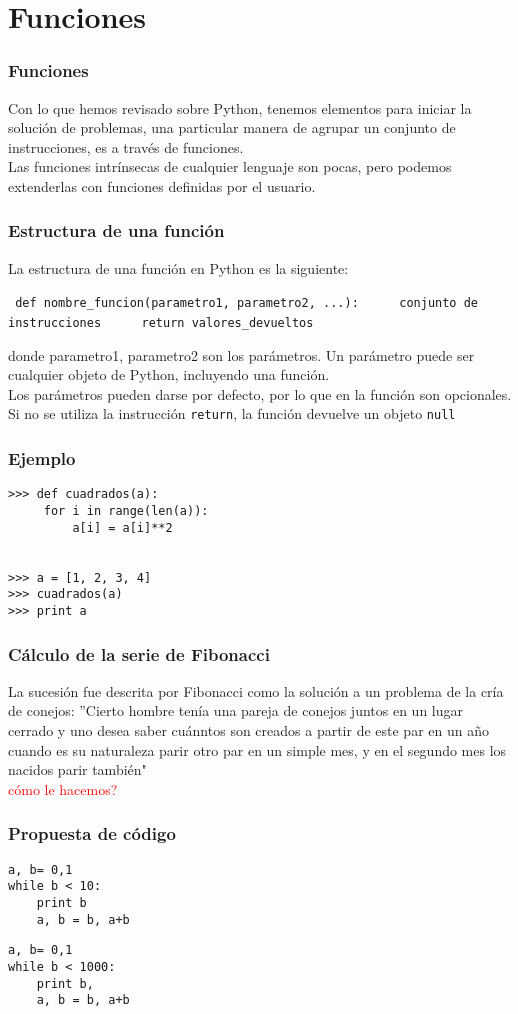 \documentclass[12pt]{beamer}
\begin{document}
\section{Funciones}
\begin{frame}
\frametitle{Funciones}
Con lo que hemos revisado sobre Python, tenemos elementos para iniciar la soluci\'{o}n de problemas, una particular manera de agrupar un conjunto de instrucciones, es a trav\'{e}s de funciones.
\\
\bigskip
Las funciones intr\'{i}nsecas de cualquier lenguaje son pocas, pero podemos extenderlas con funciones definidas por el usuario.
\end{frame}
\begin{frame}[fragile]
\frametitle{Estructura de una funci\'{o}n}
La estructura de una funci\'{o}n en Python es la siguiente:
\begin{center}
\begin{exampleblock}{}
\verb| def nombre_funcion(parametro1, parametro2, ...):|
\verb|     conjunto de instrucciones|
\verb|     return valores_devueltos|
\end{exampleblock}
\end{center}
donde parametro1, parametro2 son los par\'{a}metros. Un par\'{a}metro puede ser cualquier objeto de Python, incluyendo una funci\'{o}n.
\\
\medskip
Los par\'{a}metros pueden darse por defecto, por lo que en la funci\'{o}n son opcionales. Si no se utiliza la instrucci\'{o}n \texttt{return}, la funci\'{o}n devuelve un objeto \texttt{null}
\end{frame}
\begin{frame}[fragile]
\frametitle{Ejemplo}
\begin{lstlisting}
>>> def cuadrados(a):
     for i in range(len(a)):
         a[i] = a[i]**2


>>> a = [1, 2, 3, 4]
>>> cuadrados(a)
>>> print a
\end{lstlisting}
\end{frame}
\begin{frame}
\frametitle{C\'{a}lculo de la serie de Fibonacci}
La sucesi\'{o}n fue descrita por Fibonacci como la soluci\'{o}n a un problema de la cr\'{i}a de conejos: ''Cierto hombre ten\'{i}a una pareja de conejos juntos en un lugar cerrado y uno desea saber cu\'{a}nntos son creados a partir de este par en un año cuando es su naturaleza parir otro par en un simple mes, y en el segundo mes los nacidos parir tambi\'{e}n"
\\
\bigskip
\pause
\textcolor{red}{c\'{o}mo le hacemos?}
\end{frame}
\begin{frame}[fragile]
\frametitle{Propuesta de c\'{o}digo}
\begin{lstlisting}
a, b= 0,1
while b < 10:
    print b
    a, b = b, a+b
\end{lstlisting}
\pause
\begin{lstlisting}
a, b= 0,1
while b < 1000:
    print b,
    a, b = b, a+b
\end{lstlisting}
\end{frame}
\end{document}
